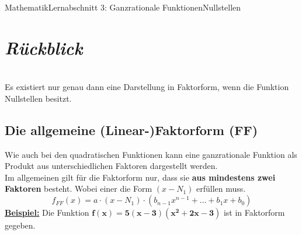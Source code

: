 \documentclass[11pt,twocolumn,oneside,openany,headings=optiontotoc,11pt,numbers=noenddot]{article}
\begin{document}
	\begin{worksheet}{Mathematik}{Lernabschnitt 3: Ganzrationale Funktionen}{Nullstellen}
		\setcounter{section}{6}
		\setcounter{subsection}{3}
		\noindent
		\section*{\textit{Rückblick}}
		\begin{framed}
			\noindent
			\underline{\color{red}{Achtung!}}\\
			Es existiert nur genau dann eine Darstellung in Faktorform, wenn die Funktion Nullstellen besitzt.
		\end{framed}
		\subsection*{Die allgemeine (Linear-)Faktorform (FF)}
		Wie auch bei den quadratischen Funktionen kann eine ganzrationale Funktion als Produkt aus unterschiedlichen Faktoren dargestellt werden.\\
		Im allgemeinen gilt für die Faktorform nur, dass sie \textbf{aus mindestens zwei Faktoren} besteht. Wobei einer die Form \((x-N_1)\) erfüllen muss.
		\[f_{FF}(x) = a\cdot{}(x-N_1)\cdot{}(b_{n-1}x^{n-1}+\ldots{}+b_1x+ b_0)\]
		\textbf{\underline{Beispiel:}} Die Funktion \(\mathbf{f(x) = 5(x-3)(x^2+2x-3)}\) ist in Faktorform gegeben.

\end{worksheet}
\end{document}
